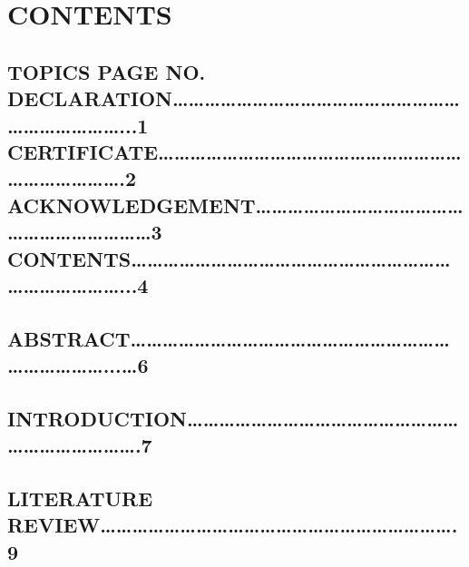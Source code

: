 \documentclass{article} %
\begin{document}
\noindent  

\noindent  

\noindent 
\section{CONTENTS }

\noindent 
\subsection{TOPICS                                                                                                             PAGE NO.  DECLARATION{\dots}{\dots}{\dots}{\dots}{\dots}{\dots}{\dots}{\dots}{\dots}{\dots}{\dots}{\dots}{\dots}{\dots}{\dots}{\dots}{\dots}{\dots}{\dots}{\dots}{\dots}{\dots}{\dots}{\dots}{\dots}...1 CERTIFICATE{\dots}{\dots}{\dots}{\dots}{\dots}{\dots}{\dots}{\dots}{\dots}{\dots}{\dots}{\dots}{\dots}{\dots}{\dots}{\dots}{\dots}{\dots}{\dots}{\dots}{\dots}{\dots}{\dots}{\dots}{\dots}{\dots}.2 ACKNOWLEDGEMENT{\dots}{\dots}{\dots}{\dots}{\dots}{\dots}{\dots}{\dots}{\dots}{\dots}{\dots}{\dots}{\dots}{\dots}{\dots}{\dots}{\dots}{\dots}{\dots}{\dots}{\dots}{\dots}3 CONTENTS{\dots}{\dots}{\dots}{\dots}{\dots}{\dots}{\dots}{\dots}{\dots}{\dots}{\dots}{\dots}{\dots}{\dots}{\dots}{\dots}{\dots}{\dots}{\dots}{\dots}{\dots}{\dots}{\dots}{\dots}{\dots}{\dots}{\dots}...4 }

\noindent 
\subsection{ABSTRACT{\dots}{\dots}{\dots}{\dots}{\dots}{\dots}{\dots}{\dots}{\dots}{\dots}{\dots}{\dots}{\dots}{\dots}{\dots}{\dots}{\dots}{\dots}{\dots}{\dots}{\dots}{\dots}{\dots}{\dots}{\dots}{\dots}...{\dots}6}

\noindent 
\subsection{INTRODUCTION{\dots}{\dots}{\dots}{\dots}{\dots}{\dots}{\dots}{\dots}{\dots}{\dots}{\dots}{\dots}{\dots}{\dots}{\dots}{\dots}{\dots}{\dots}{\dots}{\dots}{\dots}{\dots}{\dots}{\dots}{\dots}.7}

\noindent 
\subsection{LITERATURE REVIEW{\dots}{\dots}{\dots}{\dots}{\dots}{\dots}{\dots}{\dots}{\dots}{\dots}{\dots}{\dots}{\dots}{\dots}{\dots}{\dots}{\dots}{\dots}{\dots}{\dots}{\dots}{\dots}.9}
\end{document}
